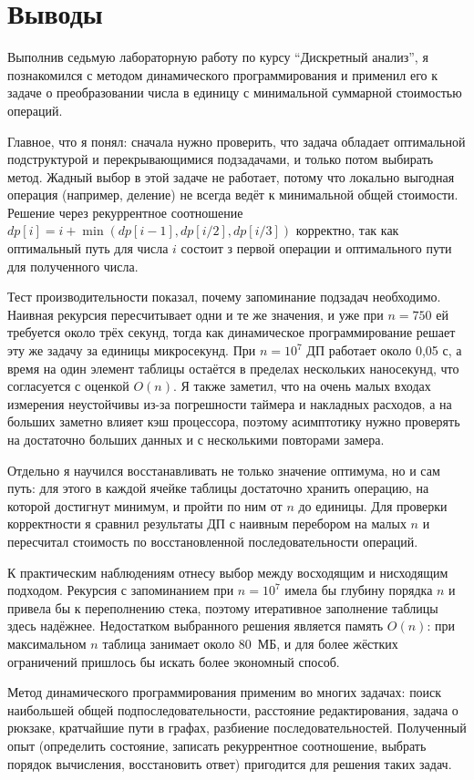 \section{Выводы}
Выполнив седьмую лабораторную работу по курсу \enquote{Дискретный анализ}, я познакомился с
методом динамического программирования и применил его к задаче о преобразовании числа в единицу с
минимальной суммарной стоимостью операций.

Главное, что я понял: сначала нужно проверить, что задача обладает оптимальной подструктурой и перекрывающимися
подзадачами, и только потом выбирать метод. Жадный выбор в этой задаче не работает, потому что локально выгодная
операция (например, деление) не всегда ведёт к минимальной общей стоимости. Решение через рекуррентное
соотношение $dp[i] = i + \min(dp[i-1], dp[i/2], dp[i/3])$ корректно, так как оптимальный путь для числа $i$ состоит 
з первой операции и оптимального пути для полученного числа.

Тест производительности показал, почему запоминание подзадач необходимо. Наивная рекурсия пересчитывает одни и те
же значения, и уже при $n = 750$ ей требуется около трёх секунд, тогда как динамическое программирование решает эту же
задачу за единицы микросекунд. При $n = 10^7$ ДП работает около 0{,}05 с, а время на один элемент таблицы остаётся в пределах
нескольких наносекунд, что согласуется с оценкой $O(n)$. Я также заметил, что на очень малых входах измерения неустойчивы из-за
погрешности таймера и накладных расходов, а на больших заметно влияет кэш процессора, поэтому асимптотику нужно проверять на
достаточно больших данных и с несколькими повторами замера.

Отдельно я научился восстанавливать не только значение оптимума, но и сам путь: для этого в каждой ячейке
таблицы достаточно хранить операцию, на которой достигнут минимум, и пройти по ним от $n$ до единицы. Для проверки
корректности я сравнил результаты ДП с наивным перебором на малых $n$ и пересчитал стоимость по восстановленной последовательности операций.

К практическим наблюдениям отнесу выбор между восходящим и нисходящим подходом. Рекурсия с запоминанием
при $n = 10^7$ имела бы глубину порядка $n$ и привела бы к переполнению стека, поэтому итеративное заполнение
таблицы здесь надёжнее. Недостатком выбранного решения является память $O(n)$: при максимальном $n$ таблица
занимает около 80~МБ, и для более жёстких ограничений пришлось бы искать более экономный способ.

Метод динамического программирования применим во многих задачах: поиск наибольшей общей
подпоследовательности, расстояние редактирования, задача о рюкзаке, кратчайшие пути в графах,
разбиение последовательностей. Полученный опыт (определить состояние, записать рекуррентное соотношение,
выбрать порядок вычисления, восстановить ответ) пригодится для решения таких задач.
\pagebreak